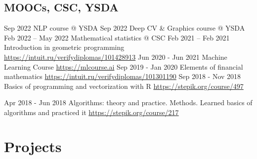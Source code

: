 \documentclass[11pt,a4paper]{moderncv}
\begin{document}
\subsection{MOOCs, CSC, YSDA}
\cventry
{Sep 2022}
{NLP course @ YSDA}
{}
{}{}{}
\cventry
{Sep 2022}
{Deep CV \& Graphics course @ YSDA}
{}
{}{}{}
\cventry
{Feb 2022 -- May 2022}
{Mathematical statistics @ CSC}
{}
{}{}{}
\cventry
{Feb 2021 -- Feb 2021}
{Introduction in geometric programming}
{}
{}{\newline\url{https://intuit.ru/verifydiplomas/101428913}}{}
\cventry
{Jun 2020 - Jun 2021}
{Machine Learning Course}
{}
{}{\newline\url{https://mlcourse.ai}}{}
\cventry
{Sep 2019 - Jan 2020}
{Elements of financial mathematics}
{}
{}{\newline\url{https://intuit.ru/verifydiplomas/101301190}}{}
\cventry
{Sep 2018 - Nov 2018}
{Basics of programming and vectorization with R}
{}
{}{\newline\url{https://stepik.org/course/497}}{}

\cventry
{Apr 2018 - Jun 2018}
{Algorithms: theory and practice. Methods.}
{\newline Learned basics of algorithms and practiced it}
{}{\newline\url{https://stepik.org/course/217}}{}

\pagebreak
\section{Projects}
\end{document}
